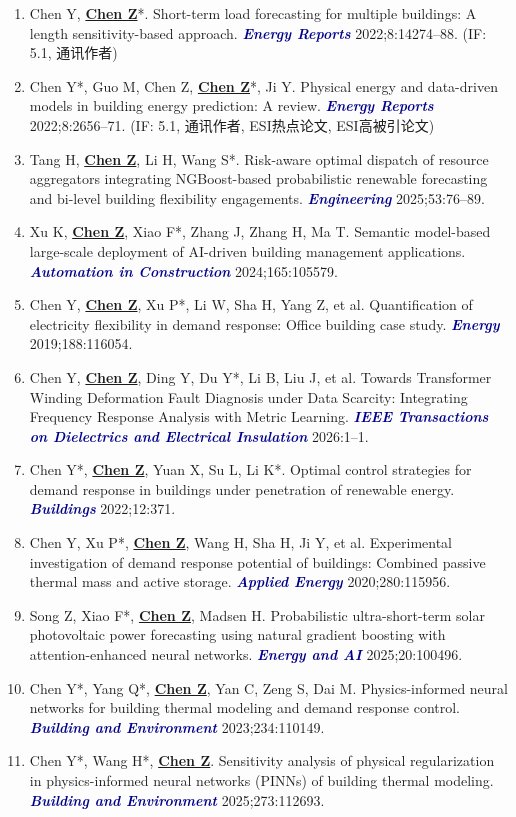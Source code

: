 \documentclass[11pt,a4paper]{article}
\newcommand{\me}[1]{\underline{\textbf{#1}}}
\newcommand{\journal}[1]{\textcolor{darkblue}{\textbf{\textit{#1}}}}
\begin{document}
\begin{enumerate}
\item Chen Y, \me{Chen Z}*. Short-term load forecasting for multiple buildings: A length sensitivity-based approach. \journal{Energy Reports} 2022;8:14274--88. (IF: 5.1, 通讯作者)
\item Chen Y*, Guo M, Chen Z, \me{Chen Z}*, Ji Y. Physical energy and data-driven models in building energy prediction: A review. \journal{Energy Reports} 2022;8:2656--71. (IF: 5.1, 通讯作者, ESI热点论文, ESI高被引论文)
\item Tang H, \me{Chen Z}, Li H, Wang S*. Risk-aware optimal dispatch of resource aggregators integrating NGBoost-based probabilistic renewable forecasting and bi-level building flexibility engagements. \journal{Engineering} 2025;53:76--89.
\item Xu K, \me{Chen Z}, Xiao F*, Zhang J, Zhang H, Ma T. Semantic model-based large-scale deployment of AI-driven building management applications. \journal{Automation in Construction} 2024;165:105579.
\item Chen Y, \me{Chen Z}, Xu P*, Li W, Sha H, Yang Z, et al. Quantification of electricity flexibility in demand response: Office building case study. \journal{Energy} 2019;188:116054.
\item Chen Y, \me{Chen Z}, Ding Y, Du Y*, Li B, Liu J, et al. Towards Transformer Winding Deformation Fault Diagnosis under Data Scarcity: Integrating Frequency Response Analysis with Metric Learning. \journal{IEEE Transactions on Dielectrics and Electrical Insulation} 2026:1--1.
\item Chen Y*, \me{Chen Z}, Yuan X, Su L, Li K*. Optimal control strategies for demand response in buildings under penetration of renewable energy. \journal{Buildings} 2022;12:371.
\item Chen Y, Xu P*, \me{Chen Z}, Wang H, Sha H, Ji Y, et al. Experimental investigation of demand response potential of buildings: Combined passive thermal mass and active storage. \journal{Applied Energy} 2020;280:115956.
\item Song Z, Xiao F*, \me{Chen Z}, Madsen H. Probabilistic ultra-short-term solar photovoltaic power forecasting using natural gradient boosting with attention-enhanced neural networks. \journal{Energy and AI} 2025;20:100496.
\item Chen Y*, Yang Q*, \me{Chen Z}, Yan C, Zeng S, Dai M. Physics-informed neural networks for building thermal modeling and demand response control. \journal{Building and Environment} 2023;234:110149.
\item Chen Y*, Wang H*, \me{Chen Z}. Sensitivity analysis of physical regularization in physics-informed neural networks (PINNs) of building thermal modeling. \journal{Building and Environment} 2025;273:112693.

\end{enumerate}
\end{document}
